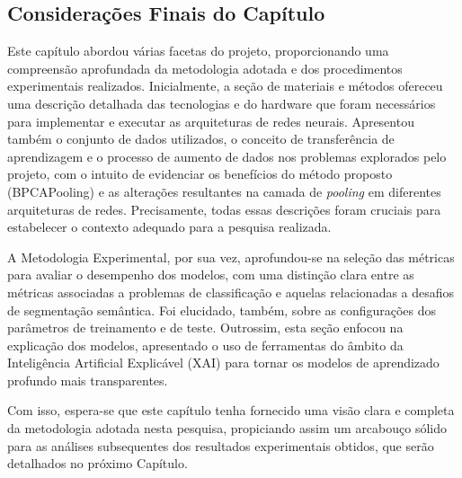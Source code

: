 

\subsection{Considerações Finais do Capítulo}
\label{project:final}
 Este capítulo abordou várias facetas do projeto, proporcionando uma compreensão aprofundada da metodologia adotada e dos procedimentos experimentais realizados. Inicialmente, a seção de materiais e métodos ofereceu uma descrição detalhada das tecnologias e do hardware que foram necessários para implementar e executar as arquiteturas de redes neurais. Apresentou também o conjunto de dados utilizados, o conceito de transferência de aprendizagem e o processo de aumento de dados nos problemas explorados pelo projeto, com o intuito de evidenciar os benefícios do método proposto (BPCAPooling) e as alterações resultantes na camada de \textit{pooling} em diferentes arquiteturas de redes. Precisamente, todas essas descrições foram cruciais para estabelecer o contexto adequado para a pesquisa realizada.

A Metodologia Experimental, por sua vez, aprofundou-se na seleção das métricas para avaliar o desempenho dos modelos, com uma distinção clara entre as métricas associadas a problemas de classificação e aquelas relacionadas a desafios de segmentação semântica. Foi elucidado, também, sobre as configurações dos parâmetros de treinamento e de teste. Outrossim, esta seção enfocou na explicação dos modelos, apresentado o uso de ferramentas do âmbito da Inteligência Artificial Explicável (XAI) para tornar os modelos de aprendizado profundo mais transparentes.


Com isso, espera-se que este capítulo tenha fornecido uma visão clara e completa da metodologia adotada nesta pesquisa, propiciando assim um arcabouço sólido para as análises subsequentes dos resultados experimentais obtidos, que serão detalhados no próximo Capítulo.